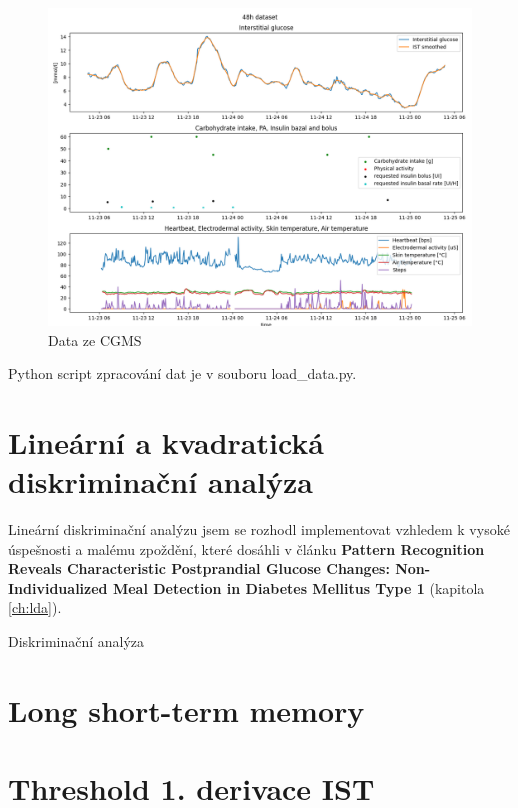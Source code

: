 \begin{figure}[H]
\caption{Data ze CGMS}
\label{tab:48h_dataset}
\centering
\includegraphics[width=1\textwidth]{img/cho/48h_dataset.png}
\end{figure}

Python script zpracování dat je v souboru load\_data.py.

\section{Lineární a kvadratická diskriminační analýza}
\label{ch:lda_qda}

Lineární diskriminační analýzu jsem se rozhodl implementovat vzhledem k vysoké úspešnosti a malému zpoždění, které dosáhli \citet{Analyza.LDA} v článku \textbf{Pattern Recognition Reveals Characteristic Postprandial Glucose Changes: Non-Individualized Meal Detection in Diabetes Mellitus Type 1} (kapitola \ref{ch:lda}).

Diskriminační analýza


\section{Long short-term memory}
\label{ch:lstm}


\section{Threshold 1. derivace IST}
\label{ch:threshold}
